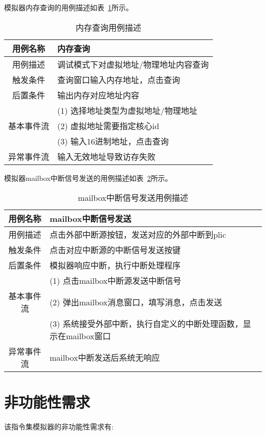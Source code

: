 模拟器内存查询的用例描述如表~\ref{tab:yongli4}所示。
\begin{table}[h]
  \centering
  \caption{内存查询用例描述}
  \label{tab:yongli4}
  \renewcommand\arraystretch{1.1}
  \begin{tabular}{cl}
    \toprule
用例名称	& 内存查询\\
    \midrule
用例描述	& 调试模式下对虚拟地址/物理地址内容查询\\ \hline
触发条件	& 查询窗口输入内存地址，点击查询\\ \hline
后置条件	& 输出内存对应地址内容\\ \hline
	& (1) 选择地址类型为虚拟地址/物理地址\\
  基本事件流 &            (2) 虚拟地址需要指定核心id\\
 &            (3) 输入16进制地址，点击查询\\ \hline
异常事件流	& 输入无效地址导致访存失败\\
    \bottomrule
  \end{tabular}
\end{table}


模拟器mailbox中断信号发送的用例描述如表~\ref{tab:yongli5}所示。
\begin{table}[h]
  \centering
  \caption{mailbox中断信号发送用例描述}
  \label{tab:yongli5}
  \renewcommand\arraystretch{1.1}
  \begin{tabular}{cl}
    \toprule
用例名称 & mailbox中断信号发送\\
    \midrule
用例描述	& 点击外部中断源按钮，发送对应的外部中断到plic\\ \hline
触发条件	& 点击对应中断源的中断信号发送按键\\ \hline
后置条件	& 模拟器响应中断，执行中断处理程序\\ \hline
 &	(1)	点击mailbox中断源发送中断信号\\
 基本事件流 & (2)	弹出mailbox消息窗口，填写消息，点击发送\\
 & (3)	系统接受外部中断，执行自定义的中断处理函数，显示在mailbox窗口\\ \hline
异常事件流 &	mailbox中断发送后系统无响应\\
    \bottomrule
  \end{tabular}
\end{table}


\section{非功能性需求}

该指令集模拟器的非功能性需求有:


